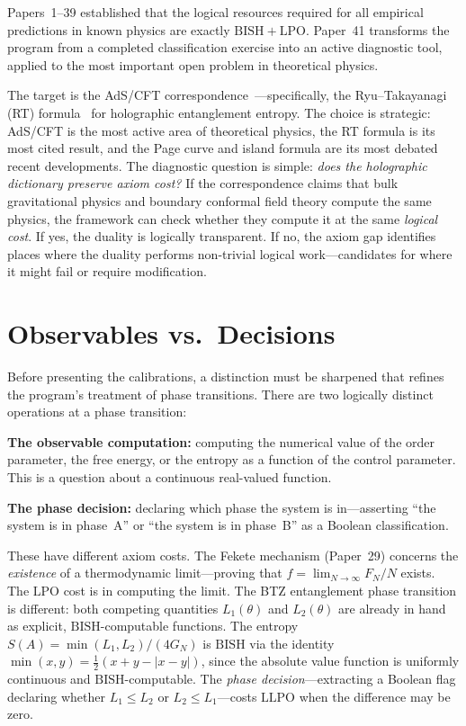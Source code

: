 \documentclass[11pt,a4paper]{report}
\theoremstyle{plain}
\theoremstyle{definition}
\theoremstyle{remark}
\newcommand{\BISH}{\mathrm{BISH}}
\newcommand{\LLPO}{\mathrm{LLPO}}
\newcommand{\LPO}{\mathrm{LPO}}
\begin{document}
Papers~1--39 established that the logical resources required for all empirical predictions in known physics are exactly $\BISH+\LPO$. Paper~41 transforms the program from a completed classification exercise into an active diagnostic tool, applied to the most important open problem in theoretical physics.

The target is the AdS/CFT correspondence~\cite{Maldacena1999}---specifically, the Ryu--Takayanagi (RT) formula~\cite{RyuTakayanagi2006} for holographic entanglement entropy. The choice is strategic: AdS/CFT is the most active area of theoretical physics, the RT formula is its most cited result, and the Page curve and island formula are its most debated recent developments. The diagnostic question is simple: \emph{does the holographic dictionary preserve axiom cost?} If the correspondence claims that bulk gravitational physics and boundary conformal field theory compute the same physics, the framework can check whether they compute it at the same \emph{logical cost}. If yes, the duality is logically transparent. If no, the axiom gap identifies places where the duality performs non-trivial logical work---candidates for where it might fail or require modification.

\section{Observables vs.\ Decisions}

Before presenting the calibrations, a distinction must be sharpened that refines the program's treatment of phase transitions. There are two logically distinct operations at a phase transition:

\textbf{The observable computation:} computing the numerical value of the order parameter, the free energy, or the entropy as a function of the control parameter. This is a question about a continuous real-valued function.

\textbf{The phase decision:} declaring which phase the system is in---asserting ``the system is in phase~A'' or ``the system is in phase~B'' as a Boolean classification.

These have different axiom costs. The Fekete mechanism (Paper~29) concerns the \emph{existence} of a thermodynamic limit---proving that $f = \lim_{N\to\infty} F_N/N$ exists. The $\LPO$ cost is in computing the limit. The BTZ entanglement phase transition is different: both competing quantities $L_1(\theta)$ and $L_2(\theta)$ are already in hand as explicit, $\BISH$-computable functions. The entropy $S(A) = \min(L_1,L_2)/(4G_N)$ is $\BISH$ via the identity $\min(x,y) = \tfrac{1}{2}(x + y - |x-y|)$, since the absolute value function is uniformly continuous and $\BISH$-computable. The \emph{phase decision}---extracting a Boolean flag declaring whether $L_1 \leq L_2$ or $L_2 \leq L_1$---costs $\LLPO$ when the difference may be zero.
\end{document}
